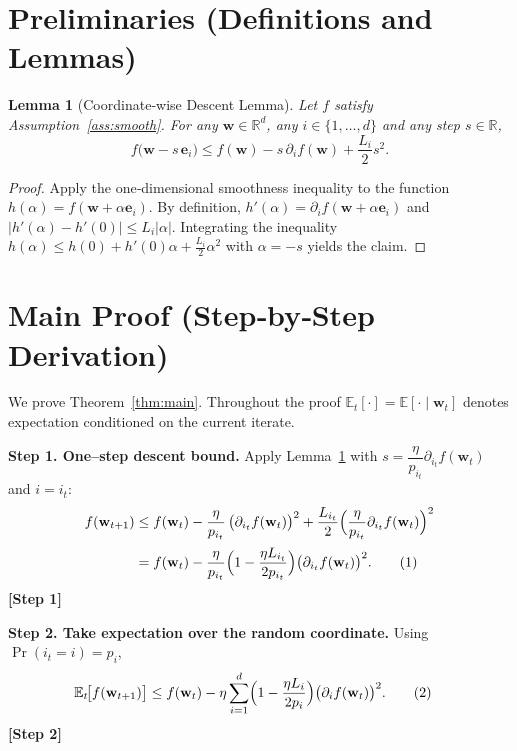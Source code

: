 \documentclass[11pt]{article}
\newtheorem{lemma}{Lemma}
\newcommand{\EE}{\mathbb{E}}
\newcommand{\RR}{\mathbb{R}}
\begin{document}
\newpage
\section*{Preliminaries (Definitions and Lemmas)}
\begin{lemma}[Coordinate‑wise Descent Lemma]
\label{lem:descent}
Let $f$ satisfy Assumption~\ref{ass:smooth}. For any $\mathbf{w}\in\RR^d$,
any $i\in\{1,\dots ,d\}$ and any step $s\in\RR$,
\[
f\bigl(\mathbf{w}-s\,\mathbf{e}_i\bigr)
\le f(\mathbf{w}) - s\,\partial_i f(\mathbf{w}) + \frac{L_i}{2}s^{2}.
\]
\end{lemma}
\begin{proof}
Apply the one‑dimensional smoothness inequality to the function
$h(\alpha)=f(\mathbf{w}+\alpha\mathbf{e}_i)$.  By definition,
$h'(\alpha)=\partial_i f(\mathbf{w}+\alpha\mathbf{e}_i)$ and
$|h'(\alpha)-h'(0)|\le L_i|\alpha|$.
Integrating the inequality $h(\alpha)\le h(0)+h'(0)\alpha+\frac{L_i}{2}\alpha^{2}$
with $\alpha=-s$ yields the claim. \qedhere
\end{proof}

\section*{Main Proof (Step‑by‑Step Derivation)}
We prove Theorem~\ref{thm:main}.  Throughout the proof
$\EE_t[\cdot]=\EE[\cdot\mid \mathbf{w}_t]$ denotes expectation conditioned on the
current iterate.

\bigskip
\noindent\textbf{Step 1. One–step descent bound.}  
Apply Lemma~\ref{lem:descent} with $s=\dfrac{\eta}{p_{i_t}}\partial_{i_t}f(\mathbf{w}_t)$
and $i=i_t$:
\begin{align}
f(\mathbf{w}_{t+1})
&\le f(\mathbf{w}_t)
- \frac{\eta}{p_{i_t}}\,\bigl(\partial_{i_t}f(\mathbf{w}_t)\bigr)^{2}
+ \frac{L_{i_t}}{2}\Bigl(\frac{\eta}{p_{i_t}}\partial_{i_t}f(\mathbf{w}_t)\Bigr)^{2}
\notag\\[0.5ex]
&= f(\mathbf{w}_t)
- \frac{\eta}{p_{i_t}}\Bigl(1-\frac{\eta L_{i_t}}{2p_{i_t}}\Bigr)
\bigl(\partial_{i_t}f(\mathbf{w}_t)\bigr)^{2}.
\tag{1}
\end{align}
\noindent\textbf{[Step 1]}

\bigskip
\noindent\textbf{Step 2. Take expectation over the random coordinate.}
Using $\Pr(i_t=i)=p_i$,
\begin{align}
\EE_t\!\bigl[f(\mathbf{w}_{t+1})\bigr]
&\le f(\mathbf{w}_t)
- \eta\sum_{i=1}^{d} \Bigl(1-\frac{\eta L_i}{2p_i}\Bigr)
\bigl(\partial_i f(\mathbf{w}_t)\bigr)^{2}.
\tag{2}
\end{align}
\noindent\textbf{[Step 2]}
\end{document}
